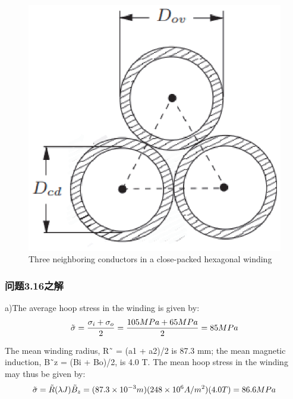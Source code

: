 \begin{figure}[htbp]
	\centering
	\includegraphics[scale=0.5]{chpt3/figs/fig3.45.eps}
	\caption{Three neighboring conductors in a close-packed hexagonal winding}
\end{figure}


\subsubsection{问题3.16之解}
a)The average hoop stress in the winding is given by:
$$
\tilde{\sigma}=\frac{\sigma_{i}+\sigma_{o}}{2}=\frac{105MPa+65MPa}{2}\\%
=85MPa\\
$$

The mean winding radius, R˜ = (a1 + a2)/2 is 87.3 mm; the mean magnetic induction, B˜z = (Bi + Bo)/2, is 4.0 T. The mean hoop stress in the winding may thus
be given by:
$$
\tilde{\sigma}=\tilde{R}(\lambda J)\tilde{B}_{z}=(87.3\times10^{-3}m)(248\times10^{6}A/m^{2})(4.0T)\\%
=86.6MPa\\
$$


